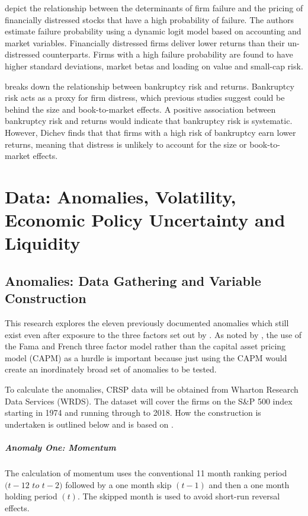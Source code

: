 \documentclass[12pt, a4paper, oneside]{article}
\begin{document}
 depict the relationship between the determinants of firm failure and the pricing of financially distressed stocks that have a high probability of failure. The authors estimate failure probability using a dynamic logit model based on accounting and market variables. Financially distressed firms deliver lower returns than their un-distressed counterparts. Firms with a high failure probability are found to have higher standard deviations, market betas and loading on value and small-cap risk. 

 breaks down the relationship between bankruptcy risk and returns. Bankruptcy risk acts as a proxy for firm distress, which previous studies suggest could be behind the size and book-to-market effects. A positive association between bankruptcy risk and returns would indicate that bankruptcy risk is systematic. However, Dichev finds that that firms with a high risk of bankruptcy earn lower returns, meaning that distress is unlikely to account for the size or book-to-market effects. 

\section{Data: Anomalies, Volatility, Economic Policy Uncertainty and Liquidity}\label{sec:data}
\subsection{Anomalies: Data Gathering and Variable Construction}
This research explores the eleven previously documented anomalies which still exist even after exposure to the three factors set out by . As noted by , the use of the Fama and French three factor model rather than the capital asset pricing model (CAPM) as a hurdle is important because just using the CAPM would create an inordinately broad set of anomalies to be tested. 

To calculate the anomalies, CRSP data will be obtained from Wharton Research Data Services (WRDS). The dataset will cover the firms on the S\&P 500 index starting in 1974 and running through to 2018. How the construction is undertaken is outlined below and is based on .

\subparagraph*{Anomaly One: Momentum}
The calculation of momentum uses the conventional 11 month ranking period $(t-12$ $to$ $t-2)$ followed by a one month skip $(t-1)$ and then a one month holding period $(t)$. The skipped month is used to avoid short-run reversal effects.
\end{document}
